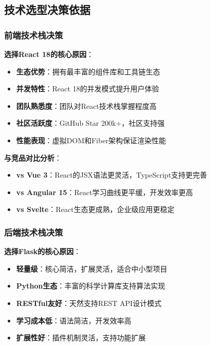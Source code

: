 \documentclass[12pt,a4paper]{article}
\begin{document}
\subsection{技术选型决策依据}

\subsubsection{前端技术栈决策}

\begin{solutionbox}[title={React 18 技术选型决策}]
\textbf{选择React 18的核心原因}：
\begin{itemize}[nosep]
    \item \textbf{生态优势}：拥有最丰富的组件库和工具链生态
    \item \textbf{并发特性}：React 18的并发模式提升用户体验
    \item \textbf{团队熟悉度}：团队对React技术栈掌握程度高
    \item \textbf{社区活跃度}：GitHub Star 200k+，社区支持强
    \item \textbf{性能表现}：虚拟DOM和Fiber架构保证渲染性能
\end{itemize}
\end{solutionbox}

\textbf{与竞品对比分析}：
\begin{itemize}
    \item \textbf{vs Vue 3}：React的JSX语法更灵活，TypeScript支持更完善
    \item \textbf{vs Angular 15}：React学习曲线更平缓，开发效率更高
    \item \textbf{vs Svelte}：React生态更成熟，企业级应用更稳定
\end{itemize}

\subsubsection{后端技术栈决策}

\begin{solutionbox}[title={Flask 2.3 技术选型决策}]
\textbf{选择Flask的核心原因}：
\begin{itemize}[nosep]
    \item \textbf{轻量级}：核心简洁，扩展灵活，适合中小型项目
    \item \textbf{Python生态}：丰富的科学计算库支持算法实现
    \item \textbf{RESTful友好}：天然支持REST API设计模式
    \item \textbf{学习成本低}：语法简洁，开发效率高
    \item \textbf{扩展性好}：插件机制灵活，支持功能扩展
\end{itemize}
\end{solutionbox}
\end{document}
